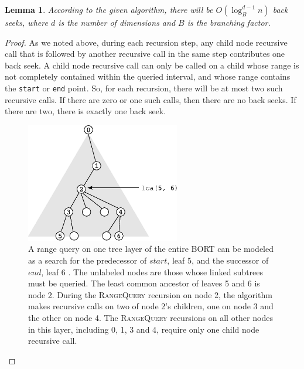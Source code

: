 \documentclass[11pt, oneside]{article}
\newcommand{\ms}{\texttt}
\newtheorem*{lemma}{Lemma}
\begin{document}
\begin{lemma}
    According to the given algorithm, there will be $O(\log_B^{d-1}n)$
    back seeks, where $d$ is the number of dimensions and $B$ is the
    branching factor. 
\end{lemma}
\begin{proof}
    As we noted above, during each recursion step, any child node recursive call
    that is followed by another recursive call in the same step contributes one
    back seek. A child node recursive call can only be called on a child
    whose range is not completely contained within the queried interval, and
    whose range contains the \ms{start} or \ms{end} point. So, for each
    recursion, there will be at most two such recursive calls. If there are zero
    or one such calls, then there are no back seeks. If there are two, there is
    exactly one back seek.

    \begin{figure}[h!]
        \centering
        \vspace{0.5in}
        \includegraphics[width=0.6\textwidth]{fig3.eps}
        \caption{
            A range query on one tree layer of the entire BORT can be modeled as
            a search for the predecessor of $start$, leaf 5, and the successor
            of $end$, leaf 6 \cite{lecture}. The unlabeled nodes are those
            whose linked subtrees must be queried. The least common ancestor of
            leaves 5 and 6 is node 2. During the \textsc{RangeQuery} recursion
            on node 2, the algorithm makes recursive calls on two of node 2's
            children, one on node 3 and the other on node 4. The
            \textsc{RangeQuery} recursions on all other nodes in this layer,
            including 0, 1, 3 and 4, require only one child node recursive call.
        }
        \vspace{0.5in}
    \end{figure}


\end{proof}
\end{document}

